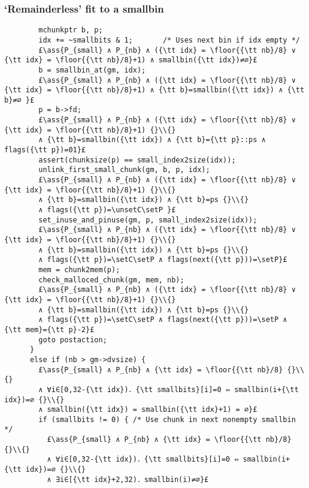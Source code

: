 \documentclass[10pt,a4paper,twoside]{report}
\makeatletter
\newcommand{\ml}[2][t]{\mbox{\mdseries\begin{tabular}[#1]{@{}L@{}}#2\end{tabular}}}
\newcommand{\ass}[1]{\ensuremath{{\color{blue}\left\{\ml[c]{#1}\right\}}}}
\renewcommand{\floor}[2][]{\left\lfloor{#2}\right\rfloor_{#1}}
\newcommand{\setC}{\raisebox{1.5pt}{$\blacktriangledown$}}
\newcommand{\unsetC}{\raisebox{1.5pt}{$\triangledown$}}
\newcommand{\setP}{{\blacktriangle}}
\makeatother
\begin{document}
\subsubsection*{`Remainderless' fit to a smallbin}\label{sect:remainderless_fit_to_a_smallbin}
\begin{lstlisting}
        mchunkptr b, p;
        idx += ~smallbits & 1;       /* Uses next bin if idx empty */
        £\ass{P_{small} ∧ P_{nb} ∧ ({\tt idx} = \floor{{\tt nb}/8} ∨ {\tt idx} = \floor{{\tt nb}/8}+1) ∧ smallbin({\tt idx})≠∅}£
        b = smallbin_at(gm, idx);
        £\ass{P_{small} ∧ P_{nb} ∧ ({\tt idx} = \floor{{\tt nb}/8} ∨ {\tt idx} = \floor{{\tt nb}/8}+1) ∧ {\tt b}=smallbin({\tt idx}) ∧ {\tt b}≠∅ }£
        p = b->fd;
        £\ass{P_{small} ∧ P_{nb} ∧ ({\tt idx} = \floor{{\tt nb}/8} ∨ {\tt idx} = \floor{{\tt nb}/8}+1) {}\\{}
        ∧ {\tt b}=smallbin({\tt idx}) ∧ {\tt b}={\tt p}::ps ∧ flags({\tt p})=01}£
        assert(chunksize(p) == small_index2size(idx));
        unlink_first_small_chunk(gm, b, p, idx);
        £\ass{P_{small} ∧ P_{nb} ∧ ({\tt idx} = \floor{{\tt nb}/8} ∨ {\tt idx} = \floor{{\tt nb}/8}+1) {}\\{}
        ∧ {\tt b}=smallbin({\tt idx}) ∧ {\tt b}=ps {}\\{}
        ∧ flags({\tt p})=\unsetC\setP }£
        set_inuse_and_pinuse(gm, p, small_index2size(idx));
        £\ass{P_{small} ∧ P_{nb} ∧ ({\tt idx} = \floor{{\tt nb}/8} ∨ {\tt idx} = \floor{{\tt nb}/8}+1) {}\\{}
        ∧ {\tt b}=smallbin({\tt idx}) ∧ {\tt b}=ps {}\\{}
        ∧ flags({\tt p})=\setC\setP ∧ flags(next({\tt p}))=\setP}£
        mem = chunk2mem(p);
        check_malloced_chunk(gm, mem, nb);
        £\ass{P_{small} ∧ P_{nb} ∧ ({\tt idx} = \floor{{\tt nb}/8} ∨ {\tt idx} = \floor{{\tt nb}/8}+1) {}\\{}
        ∧ {\tt b}=smallbin({\tt idx}) ∧ {\tt b}=ps {}\\{}
        ∧ flags({\tt p})=\setC\setP ∧ flags(next({\tt p}))=\setP ∧ {\tt mem}={\tt p}-2}£ 
        goto postaction;
      }
      else if (nb > gm->dvsize) {
        £\ass{P_{small} ∧ P_{nb} ∧ {\tt idx} = \floor{{\tt nb}/8} {}\\{}
        ∧ ∀i∈[0,32-{\tt idx})．{\tt smallbits}[i]=0 ⇔ smallbin(i+{\tt idx})=∅ {}\\{}
        ∧ smallbin({\tt idx}) = smallbin({\tt idx}+1) = ∅}£
        if (smallbits != 0) { /* Use chunk in next nonempty smallbin */
          £\ass{P_{small} ∧ P_{nb} ∧ {\tt idx} = \floor{{\tt nb}/8} {}\\{}
          ∧ ∀i∈[0,32-{\tt idx})．{\tt smallbits}[i]=0 ⇔ smallbin(i+{\tt idx})=∅ {}\\{}
          ∧ ∃i∈[{\tt idx}+2,32)．smallbin(i)≠∅}£
\end{lstlisting}
\end{document}
